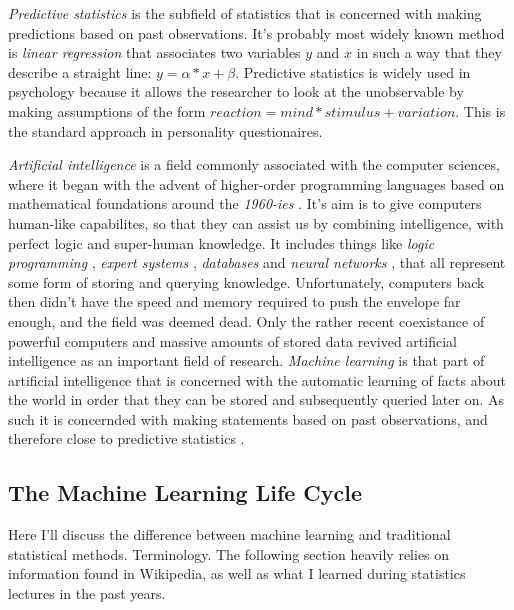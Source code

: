 \documentclass[a4paper,man,12pt,apacite]{apa6} %
\begin{document}
\emph{Predictive statistics} is the subfield of statistics that is
concerned with making predictions based on past observations.
It's probably most widely known method is \emph{linear regression}
\cite{wpLR} that associates two variables \(y\) and \(x\) in such a way
that they describe a straight line: \(y = \alpha * x + \beta \).
Predictive statistics is widely used in psychology because it
allows the researcher to look at the unobservable by making
assumptions of the form \(reaction = mind * stimulus + variation\).
This is the standard approach in personality questionaires.

\emph{Artificial intelligence} is a field commonly associated with the
computer sciences, where it began with the advent of higher-order
programming languages based on mathematical foundations around the \emph{1960-ies} \cite{wpHOPL}.
It's aim is to give computers human-like capabilites, so that they can assist
us by combining intelligence, with perfect logic and super-human knowledge.
It includes things like \emph{logic programming} \cite{wpLP},
\emph{expert systems} \cite{wpES}, \emph{databases} \cite{wpDB} and
\emph{neural networks} \cite{wpNN}, that all represent some form of
storing and querying knowledge.
Unfortunately, computers back then didn't have the speed and memory required
to push the envelope far enough, and the field was deemed dead.
Only the rather recent coexistance of powerful computers and massive amounts
of stored data revived artificial intelligence as an important field of
research.
\emph{Machine learning} is that part of artificial intelligence that
is concerned with the automatic learning of facts about the world in order
that they can be stored and subsequently queried later on.
As such it is concernded with making statements based on past observations,
and therefore close to predictive statistics \cite{wpML}.

\subsection{The Machine Learning Life Cycle}
Here I'll discuss the difference between machine learning and traditional
statistical methods. Terminology.
The following section heavily relies on information found in Wikipedia, as
well as what I learned during statistics lectures in the past years.
\end{document}
